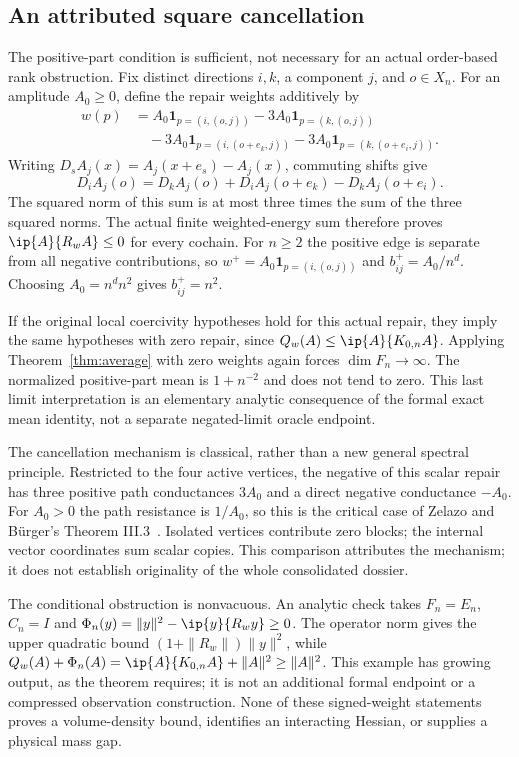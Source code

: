 \subsection{An attributed square cancellation}
The positive-part condition is sufficient, not necessary for an actual
order-based rank obstruction. Fix distinct directions $i,k$, a component
$j$, and $o\in X_n$. For an amplitude $A_0\geq0$, define the repair
weights additively by
\begin{align*}
 w(p)&=A_0\mathbf1_{p=(i,(o,j))}
       -3A_0\mathbf1_{p=(k,(o,j))}\\
     &\quad-3A_0\mathbf1_{p=(i,(o+e_k,j))}
       -3A_0\mathbf1_{p=(k,(o+e_i,j))}.
\end{align*}
Writing $D_s A_j(x)=A_j(x+e_s)-A_j(x)$, commuting shifts give
\[
 D_i A_j(o)=D_k A_j(o)+D_i A_j(o+e_k)-D_k A_j(o+e_i).
\]
The squared norm of this sum is at most three times the sum of the
three squared norms. The actual finite weighted-energy sum therefore
proves $\ip{A}{R_wA}\leq0$ for every cochain.
For $n\geq2$ the positive edge is separate from all negative contributions,
so $w^+=A_0\mathbf1_{p=(i,(o,j))}$ and $b^+_{ij}=A_0/n^d$.
Choosing $A_0=n^d n^2$ gives $b^+_{ij}=n^2$.

If the original local coercivity hypotheses hold for this actual repair,
they imply the same hypotheses with zero repair, since $Q_w(A)\leq
\ip{A}{K_{0,n}A}$. Applying Theorem~\ref{thm:average} with zero weights
again forces $\dim F_n\to\infty$. The normalized positive-part mean is
$1+n^{-2}$ and does not tend to zero. This last limit interpretation is
an elementary analytic consequence of the formal exact mean identity,
not a separate negated-limit oracle endpoint.

The cancellation mechanism is classical, rather than a new general
spectral principle. Restricted to the four active vertices, the negative
of this scalar repair has three positive path conductances $3A_0$ and a
direct negative conductance $-A_0$. For $A_0>0$ the path resistance is
$1/A_0$, so this is the critical case of Zelazo and B\"urger's
Theorem III.3~\cite{zelazo}. Isolated vertices contribute zero blocks;
the internal vector coordinates sum scalar copies. This comparison
attributes the mechanism; it does not establish originality of the
whole consolidated dossier.

The conditional obstruction is nonvacuous. An analytic check takes
$F_n=E_n$, $C_n=I$ and
$\Phi_n(y)=\|y\|^2-\ip{y}{R_w y}\geq0$.
The operator norm gives the upper quadratic bound
$(1+\|R_w\|)\|y\|^2$, while $Q_w(A)+\Phi_n(A)
=\ip{A}{K_{0,n}A}+\|A\|^2\geq\|A\|^2$.
This example has growing output, as the theorem requires; it is not an
additional formal endpoint or a compressed observation construction.
None of these signed-weight statements proves a volume-density bound,
identifies an interacting Hessian, or supplies a physical mass gap.
